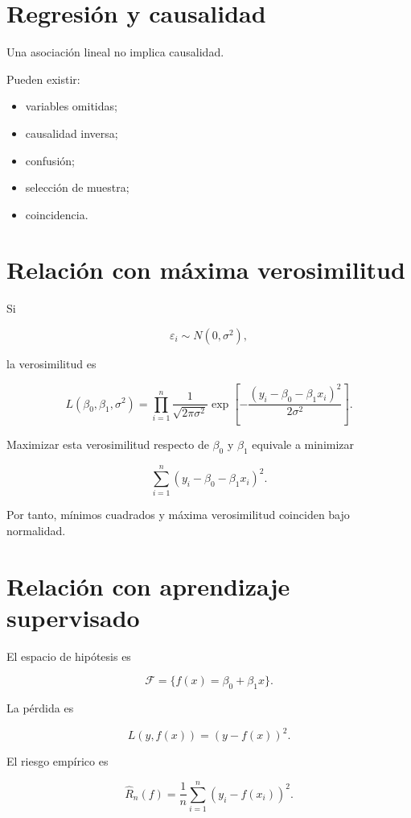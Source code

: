 \documentclass[
  spanish,
  11pt,
  letterpaper,
  DIV=11,
  numbers=noendperiod]{scrreprt}
\providecommand{\tightlist}{%
  \setlength{\itemsep}{0pt}\setlength{\parskip}{0pt}}
\theoremstyle{definition}
\theoremstyle{plain}
\theoremstyle{definition}
\theoremstyle{remark}
\begin{document}
\section{Regresión y causalidad}\label{regresiuxf3n-y-causalidad}

Una asociación lineal no implica causalidad.

Pueden existir:

\begin{itemize}
\tightlist
\item
  variables omitidas;
\item
  causalidad inversa;
\item
  confusión;
\item
  selección de muestra;
\item
  coincidencia.
\end{itemize}

\section{Relación con máxima
verosimilitud}\label{relaciuxf3n-con-muxe1xima-verosimilitud}

Si

\[
\varepsilon_i
\sim
N(0,\sigma^2),
\]

la verosimilitud es

\[
L(\beta_0,\beta_1,\sigma^2)
=
\prod_{i=1}^{n}
\frac{1}{
\sqrt{2\pi\sigma^2}
}
\exp
\left[
-\frac{
(y_i-\beta_0-\beta_1x_i)^2
}{
2\sigma^2
}
\right].
\]

Maximizar esta verosimilitud respecto de \(\beta_0\) y \(\beta_1\)
equivale a minimizar

\[
\sum_{i=1}^{n}
(y_i-\beta_0-\beta_1x_i)^2.
\]

Por tanto, mínimos cuadrados y máxima verosimilitud coinciden bajo
normalidad.

\section{Relación con aprendizaje
supervisado}\label{relaciuxf3n-con-aprendizaje-supervisado}

El espacio de hipótesis es

\[
\mathcal{F}
=
\{
f(x)=\beta_0+\beta_1x
\}.
\]

La pérdida es

\[
L(y,f(x))
=
(y-f(x))^2.
\]

El riesgo empírico es

\[
\widehat{R}_n(f)
=
\frac{1}{n}
\sum_{i=1}^{n}
(y_i-f(x_i))^2.
\]
\end{document}
